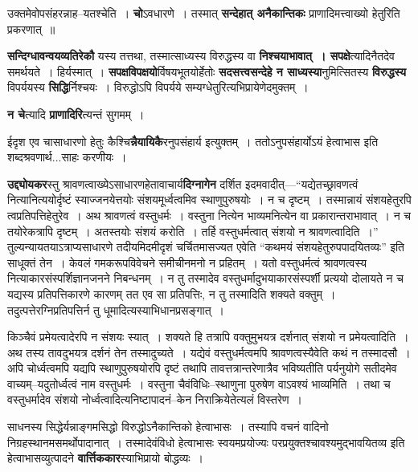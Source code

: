 \documentclass[article,12pt,a4paper]{memoir}
\begin{document}
	  \pstart उक्तमेवोपसंहरन्नाह--यतश्चेति । \textbf{चो}ऽवधारणे । तस्मात् \textbf{सन्देहात् अनैकान्तिकः} प्राणादिमत्त्वाख्यो हेतुरिति प्रकरणात् ॥
	\pend
      

	  \pstart \textbf{सन्दिग्धावन्वयव्यतिरेकौ} यस्य तत्तथा, तस्मात्साध्यस्य विरुद्धस्य वा \textbf{निश्चयाभावात् । सपक्षे}त्यादि\leavevmode{}नैतदेव समर्थयते । हिर्यस्मात् । \textbf{सपक्षविपक्षयो}र्विषयभूतयोर्हेतोः \textbf{सदसत्त्वसन्देहे न साध्यस्या}नुमित्सितस्य \textbf{विरुद्धस्य} विपर्ययस्य \textbf{सिद्धि}र्निश्चयः । विरुद्धोऽपि विपर्यये सम्यग्धेतुरित्यभिप्रायेणेदमुक्तम् ।
	\pend
      

	  \pstart \textbf{न चे}त्यादि \textbf{प्राणादिरि}त्यन्तं सुगमम् ।
	\pend
      

	  \pstart ईदृश एव चासाधारणो हेतुः कैश्चि\textbf{न्नैयायिकै}रनुपसंहार्य इत्युक्तम् । ततोऽनुपसंहार्योऽयं हेत्वाभास इति शब्दश्रवणार्थ...साहः करणीयः ।
	\pend
      

	  \pstart \textbf{उद्द्योयकर}स्तु श्रावणत्वाख्येऽसाधारणहेतावाचार्य\textbf{दिग्नागेन} दर्शित इदमवादीत्—“यद्येतच्छ्रावणत्वं नित्यानित्ययोर्दृष्टं स्याज्जनयेत्तयोः संशयमूर्ध्वत्वमिव स्थाणुपुरुषयोः । न च दृष्टम् । तस्मान्नायं संशयहेतुरपि त्वप्रतिपत्तिहेतुरेव । अथ श्रावणत्वं वस्तुधर्मः । वस्तुना नित्येन भाव्यमनित्येन वा प्रकारान्तराभावात् । न च तयोरेकत्रापि दृष्टम् । अतस्तयोः संशयं करोति । तर्हि वस्तुधर्मत्वात् संशयो न श्रावणत्वादिति ।” तुल्यन्यायतयाऽत्राप्यसाधारणे तदीयमिदमीदृशं चर्चितमासज्यत एवेति “कथमयं संशयहेतुरुपपादयितव्यः” इति साधूक्तं तेन । केवलं गमकरूपविवेचने समीचीनमनो न प्रहितम् । यतो वस्तुधर्मत्वं श्रावणत्वस्य नित्याकारसंस्पर्शिज्ञानजनने निबन्धनम् । न तु तस्मादेव वस्तुधर्मादुभयाकारसंस्पर्शी प्रत्ययो दोलायते न च यद्यस्य प्रतिपत्तिकारणे कारणम् तत एव सा प्रतिपत्तिः, न तु तस्मादिति शक्यते वक्तुम् । तदुत्पत्तेरग्निप्रतिपत्तिर्न तु धूमादित्यस्याभिधानप्रसङ्गात् ।
	\pend

	  \pstart किञ्चैवं प्रमेयत्वादेरपि न संशयः स्यात् । शक्यते हि तत्रापि वक्तुमुभयत्र दर्शनात् संशयो न प्रमेयत्वादिति । अथ तस्य तावदुभयत्र दर्शनं तेन तस्मादुच्यते । यद्येवं वस्तुधर्मत्वमपि श्रावणत्वस्यैवेति कथं न तस्मादसौ । अपि चोर्ध्वत्वमपि यद्यपि स्थाणुपुरुषयोरपि दृष्टं तथापि तावत्तत्रान्तरेणात्रैव भविष्यतीति पर्यनुयोगे सतीदमेव वाच्यम्--यदुतोर्ध्वत्वं नाम वस्तुधर्मः । वस्तुना चैवंविधिः--स्थाणुना पुरुषेण वाऽवश्यं भाव्यमिति । तथा च वस्तुधर्मादेव संशयो नोर्ध्वत्वादित्यनिष्टापादनं--केन निराक्रियेतेत्यलं विस्तरेण ।
	\pend
      

	  \pstart साधनस्य सिद्धेर्यन्नाङ्गमसिद्धो विरुद्धोऽनैकान्तिको हेत्वाभासः । तस्यापि वचनं वादिनो निग्रहस्थानमसमर्थोपादानात् । तस्मादेवंविधो हेत्वाभासः स्वयमप्रयोज्यः परप्रयुक्तश्चावश्यमुद्भावयितव्य इति हेत्वाभासव्युत्पादने \textbf{वार्त्तिककार}स्याभिप्रायो बोद्धव्यः ।
	\pend
      
\end{document}
